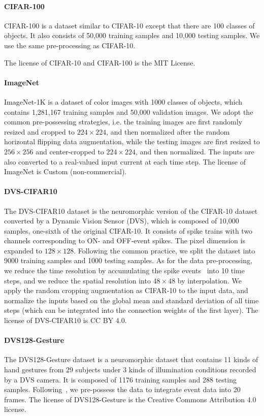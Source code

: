 \documentclass{article}
\begin{document}
\paragraph{CIFAR-100} CIFAR-100 is a dataset similar to CIFAR-10 except that there are 100 classes of objects. It also consists of 50,000 training samples and 10,000 testing samples. We use the same pre-processing as CIFAR-10.

The license of CIFAR-10 and CIFAR-100 is the MIT License. 

\paragraph{ImageNet} ImageNet-1K is a dataset of color images with 1000 classes of objects, which contains 1,281,167 training samples and 50,000 validation images. We adopt the common pre-possessing strategies, i.e. the training images are first randomly resized and cropped to $224\times224$, and then normalized after the random horizontal flipping data augmentation, while the testing images are first resized to $256\times256$ and center-cropped to $224\times224$, and then normalized. The inputs are also converted to a real-valued input current at each time step. The license of ImageNet is Custom (non-commercial).

\paragraph{DVS-CIFAR10}
The DVS-CIFAR10 dataset is the neuromorphic version of the CIFAR-10 dataset converted by a Dynamic Vision Sensor (DVS), which is composed of 10,000 samples, one-sixth of the original CIFAR-10. It consists of spike trains with two channels corresponding to ON- and OFF-event spikes. The pixel dimension is expanded to $128\times128$. Following the common practice, we split the dataset into 9000 training samples and 1000 testing samples. As for the data pre-processing, we reduce the time resolution by accumulating the spike events~\cite{Fang_2021_ICCV} into 10 time steps, and we reduce the spatial resolution into $48\times48$ by interpolation. We apply the random cropping augmentation as CIFAR-10 to the input data, and normalize the inputs based on the global mean and standard deviation of all time steps (which can be integrated into the connection weights of the first layer). The license of DVS-CIFAR10 is CC BY 4.0.

\paragraph{DVS128-Gesture}
The DVS128-Gesture dataset is a neuromorphic dataset that contains 11 kinds of hand gestures from 29 subjects under 3 kinds of illumination
conditions recorded by a DVS camera. It is composed of 1176 training samples and 288 testing samples. Following~\cite{Fang_2021_ICCV}, we pre-possess the data to integrate event data into 20 frames. 
The license of DVS128-Gesture is the Creative Commons Attribution 4.0 license.
\end{document}
